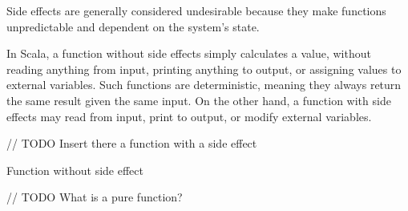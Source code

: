 Side effects are generally considered undesirable because they make functions unpredictable and dependent on the system's state.

In Scala, a function without side effects simply calculates a value, without reading anything from input, printing anything to output, or assigning values to external variables. Such functions are deterministic, meaning they always return the same result given the same input. On the other hand, a function with side effects may read from input, print to output, or modify external variables.

// TODO
Insert there a function with a side effect

Function without side effect




// TODO
What is a pure function?\footnotemark

